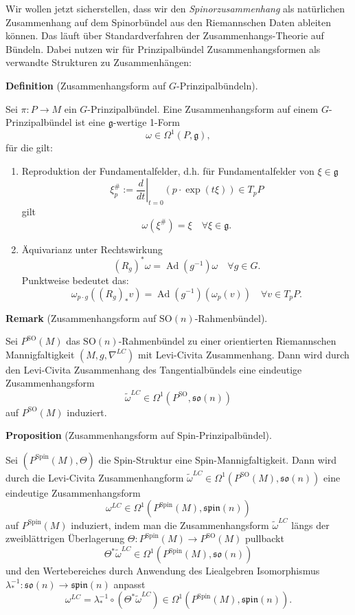 \documentclass[10pt, letterpaper]{article}
\newcommand{\SO}{\mathrm{SO}}
\newcommand{\Spin}{\mathrm{Spin}}
\newcommand{\CustomHeading}[3]{%
  \par\medskip\noindent%
  \textbf{#1 #2} \textnormal{(#3)}.\enskip%
}
\newenvironment{DEF}[2]{\CustomHeading{Definition}{#1}{#2}}{}
\newenvironment{PROP}[2]{\CustomHeading{Proposition}{#1}{#2}}{}
\newenvironment{REM}[2]{\CustomHeading{Remark}{#1}{#2}}{}
\begin{document}
Wir wollen jetzt sicherstellen, dass wir den \emph{Spinorzusammenhang} als natürlichen Zusammenhang auf dem Spinorbündel aus den Riemannschen Daten ableiten können. Das läuft über Standardverfahren der Zusammenhangs-Theorie auf Bündeln. Dabei nutzen wir für Prinzipalbündel Zusammenhangsformen als verwandte Strukturen zu Zusammenhängen: 


\begin{DEF}{}{Zusammenhangsform auf $G$-Prinzipalbündeln}
  Sei $\pi:P\to M$ ein $G$-Prinzipalbündel. Eine Zusammenhangsform auf einem $G$-Prinzipalbündel ist eine $\mathfrak{g}$-wertige 1-Form
  $$
  \omega \in \Omega^1(P, \mathfrak{g}),
  $$
  für die gilt:
  \begin{enumerate}
    \item Reproduktion der Fundamentalfelder, d.h. für Fundamentalfelder von $\xi\in \mathfrak{g}$
    $$\xi_p^{\#}:=\left.\frac{d}{d t}\right|_{t=0}(p \cdot \exp (t \xi)) \in T_p P$$
    gilt
    $$
    \omega\left(\xi^{\#}\right)=\xi \quad \forall \xi \in \mathfrak{g} .
    $$
    \item Äquivarianz unter Rechtswirkung
    $$
    \left(R_g\right)^* \omega=\operatorname{Ad}\left(g^{-1}\right) \omega \quad \forall g \in G .
    $$
    Punktweise bedeutet das:
    $$
    \omega_{p \cdot g}\left(\left(R_g\right)_* v\right)=\operatorname{Ad}\left(g^{-1}\right)\left(\omega_p(v)\right) \quad \forall v \in T_p P .
    $$
  \end{enumerate}
\end{DEF}


\begin{REM}{}{Zusammenhangsform auf $\SO(n)$-Rahmenbündel}
  Sei $P^{\SO}(M)$ das $\SO(n)$-Rahmenbündel zu einer orientierten Riemannschen Mannigfaltigkeit $(M,g,\nabla^{LC})$ mit Levi-Civita Zusammenhang. Dann wird durch den Levi-Civita Zusammenhang des Tangentialbündels eine eindeutige Zusammenhangsform 
  $$\widetilde\omega^{LC}\in \Omega^1(P^\SO,\mathfrak{so}(n))$$ 
  auf $P^\SO(M)$ induziert.
\end{REM}



\begin{PROP}{}{Zusammenhangsform auf Spin-Prinzipalbündel}
  Sei $(P^\Spin(M),\Theta)$ die Spin-Struktur eine Spin-Mannigfaltigkeit. Dann wird durch die Levi-Civita Zusammenhangform $\widetilde\omega^{LC}\in\Omega^1(P^\SO(M),\mathfrak{so}(n))$ eine eindeutige Zusammenhangsform 
  $$\omega^{LC}\in \Omega^1(P^{\Spin}(M),\mathfrak{spin}(n))$$ 
  auf $P^\Spin(M)$ induziert, indem man die Zusammenhangsform $\widetilde\omega^{LC}$ längs der zweiblättrigen Überlagerung $\Theta: P^\Spin(M) \to P^\SO(M)$ pullbackt 
  $${\Theta}^*\widetilde\omega^{LC}\in \Omega^1(P^\Spin(M),\mathfrak{so}(n))$$
  und den Wertebereiches durch Anwendung des Liealgebren Isomorphismus $\lambda_*^{-1}:\mathfrak{so}(n)\to\mathfrak{spin}(n)$ anpasst
  $$\omega^{LC}=\lambda_*^{-1}\circ \left(\Theta^*\widetilde \omega^{LC}\right)\in \Omega^1(P^\Spin(M),\mathfrak{spin}(n)).$$

\end{PROP}
\end{document}

